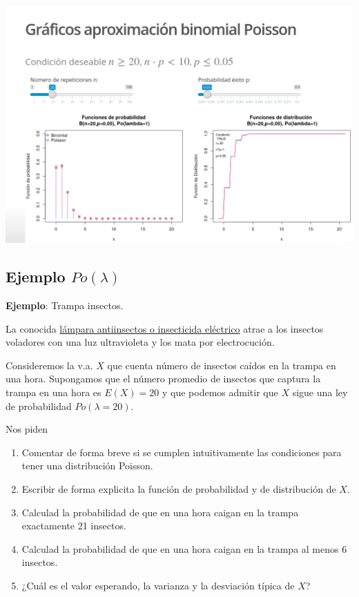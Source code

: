\documentclass[]{book}
\providecommand{\tightlist}{%
  \setlength{\itemsep}{0pt}\setlength{\parskip}{0pt}}
\begin{document}
\href{https://github.com/joanby/probabilidad}{\includegraphics{Images/noshinyImages/interactiva_poisson1.png}}

\hypertarget{ejemplo-polambda}{%
\subsection{\texorpdfstring{Ejemplo \(Po(\lambda)\)}{Ejemplo Po(\textbackslash{}lambda)}}\label{ejemplo-polambda}}

\textbf{Ejemplo}: Trampa insectos.

La conocida \href{https://es.wikipedia.org/wiki/Insecticida_el\%C3\%A9ctrico}{lámpara antiinsectos o insecticida eléctrico} atrae a los insectos voladores con una luz ultravioleta y los mata por electrocución.

Consideremos la v.a. \(X\) que cuenta número de insectos caídos en la trampa en una hora. Supongamos que el número promedio de insectos que captura la trampa en una hora es \(E(X)=20\) y que podemos admitir que \(X\) sigue una ley de probabilidad \(Po(\lambda=20)\).

Nos piden

\begin{enumerate}
\def\labelenumi{\arabic{enumi}.}
\tightlist
\item
  Comentar de forma breve si se cumplen intuitivamente las condiciones para tener una distribución Poisson.
\item
  Escribir de forma explicita la función de probabilidad y de distribución de \(X\).
\item
  Calculad la probabilidad de que en una hora caigan en la trampa exactamente 21 insectos.
\item
  Calculad la probabilidad de que en una hora caigan en la trampa al menos 6 insectos.
\item
  ¿Cuál es el valor esperando, la varianza y la desviación típica de \(X\)?
\end{enumerate}
\end{document}
